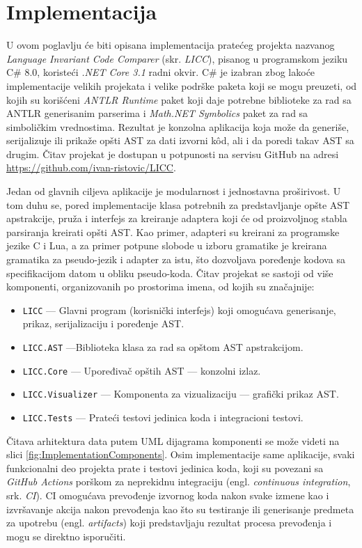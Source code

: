 \chapter{Implementacija}
\label{chp:Implementation}

U ovom poglavlju će biti opisana implementacija pratećeg projekta nazvanog \emph{Language Invariant Code Comparer} (skr. \emph{LICC}), pisanog u programskom jeziku C\# 8.0, koristeći \emph{.NET Core 3.1} radni okvir. C\# je izabran zbog lakoće implementacije velikih projekata i velike podrške paketa koji se mogu preuzeti, od kojih su korišćeni \emph{ANTLR Runtime} paket koji daje potrebne biblioteke za rad sa ANTLR generisanim parserima i \emph{Math.NET Symbolics} paket za rad sa simboličkim vrednostima. Rezultat je konzolna aplikacija koja može da generiše, serijalizuje ili prikaže opšti AST za dati izvorni k\^od, ali i da poredi takav AST sa drugim. Čitav projekat je dostupan u potpunosti na servisu GitHub na adresi \url{https://github.com/ivan-ristovic/LICC}.

Jedan od glavnih ciljeva aplikacije je modularnost i jednostavna proširivost. U tom duhu se, pored implementacije klasa potrebnih za predstavljanje opšte AST apstrakcije, pruža i interfejs za kreiranje adaptera koji će od proizvoljnog stabla parsiranja kreirati opšti AST. Kao primer, adapteri su kreirani za programske jezike C i Lua, a za primer potpune slobode u izboru gramatike je kreirana gramatika za pseudo-jezik i adapter za istu, što dozvoljava poređenje kodova sa specifikacijom datom u obliku pseudo-koda. Čitav projekat se sastoji od više komponenti, organizovanih po prostorima imena, od kojih su značajnije:
\begin{itemize}
    \item \texttt{LICC} --- Glavni program (korisnički interfejs) koji omogućava generisanje, prikaz, serijalizaciju i poređenje AST.
    \item \texttt{LICC.AST} ---Biblioteka klasa za rad sa opštom AST apstrakcijom.
    \item \texttt{LICC.Core} --- Upoređivač opštih AST --- konzolni izlaz.
    \item \texttt{LICC.Visualizer} --- Komponenta za vizualizaciju --- grafički prikaz AST.
    \item \texttt{LICC.Tests} --- Prateći testovi jedinica koda i integracioni testovi.
\end{itemize}

Čitava arhitektura data putem UML dijagrama komponenti se može videti na slici \ref{fig:ImplementationComponents}. Osim implementacije same aplikacije, svaki funkcionalni deo projekta prate i testovi jedinica koda, koji su povezani sa \emph{GitHub Actions} porškom za neprekidnu integraciju (engl. \emph{continuous integration}, srk. \emph{CI}). CI omogućava prevođenje izvornog koda nakon svake izmene kao i izvršavanje akcija nakon prevođenja kao što su testiranje ili generisanje predmeta za upotrebu (engl. \emph{artifacts}) koji predstavljaju rezultat procesa prevođenja i mogu se direktno isporučiti.

